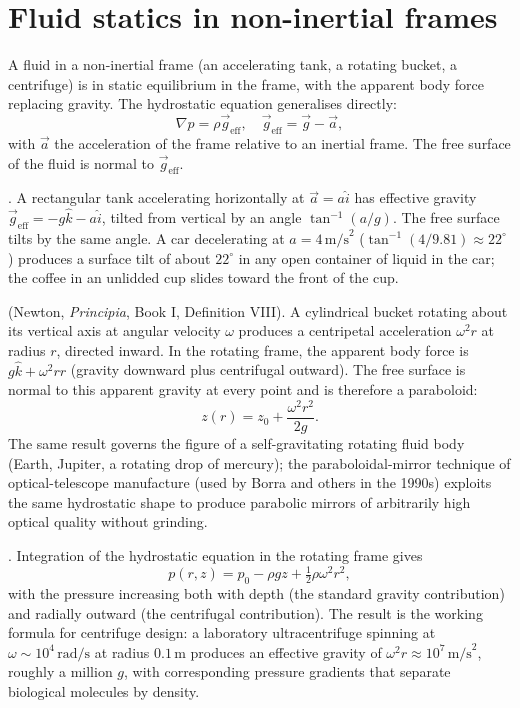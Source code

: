 \section{Fluid statics in non-inertial frames}

A fluid in a non-inertial frame (an accelerating tank, a
rotating bucket, a centrifuge) is in static equilibrium in the
frame, with the apparent body force replacing gravity. The
hydrostatic equation generalises directly:
\[
\nabla p = \rho \vec{g}_{\text{eff}}, \quad \vec{g}_{\text{eff}}
= \vec{g} - \vec{a},
\]
with $\vec{a}$ the acceleration of the frame relative to an
inertial frame. The free surface of the fluid is normal to
$\vec{g}_{\text{eff}}$.

. A rectangular tank
accelerating horizontally at $\vec{a} = a\hat{i}$ has effective
gravity $\vec{g}_{\text{eff}} = -g\hat{k} - a\hat{i}$, tilted from
vertical by an angle $\tan^{-1}(a/g)$. The free surface tilts by
the same angle. A car decelerating at $a = 4\,\text{m/s}^2$
($\tan^{-1}(4/9.81) \approx 22^{\circ}$) produces a surface tilt
of about $22^{\circ}$ in any open container of liquid in the
car; the coffee in an unlidded cup slides toward the front of
the cup.

 (Newton, \emph{Principia}, Book I,
Definition VIII). A cylindrical bucket rotating about its
vertical axis at angular velocity $\omega$ produces a centripetal
acceleration $\omega^2 r$ at radius $r$, directed inward. In the
rotating frame, the apparent body force is $g\hat{k} + \omega^2 r
\hat{r}$ (gravity downward plus centrifugal outward). The free
surface is normal to this apparent gravity at every point and is
therefore a paraboloid:
\[
z(r) = z_0 + \frac{\omega^2 r^2}{2 g}.
\]
The same result governs the figure of a self-gravitating rotating
fluid body (Earth, Jupiter, a rotating drop of mercury); the
paraboloidal-mirror technique of optical-telescope manufacture
(used by Borra and others in the 1990s) exploits the same
hydrostatic shape to produce parabolic mirrors of arbitrarily
high optical quality without grinding.



. Integration of
the hydrostatic equation in the rotating frame gives
\[
p(r, z) = p_0 - \rho g z + \tfrac{1}{2} \rho \omega^2 r^2,
\]
with the pressure increasing both with depth (the standard
gravity contribution) and radially outward (the centrifugal
contribution). The result is the working formula for centrifuge
design: a laboratory ultracentrifuge spinning at $\omega \sim
10^4\,\text{rad/s}$ at radius $0.1\,\si{\meter}$ produces an
effective gravity of $\omega^2 r \approx 10^7\,\text{m/s}^2$,
roughly a million $g$, with corresponding pressure gradients
that separate biological molecules by density.

